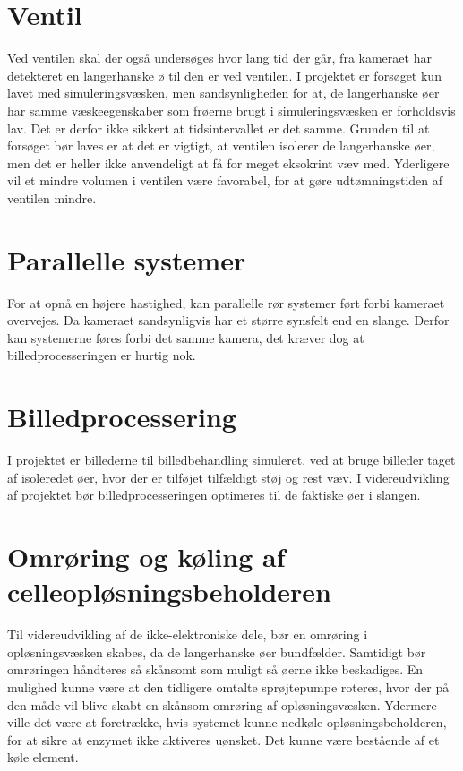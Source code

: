 \section{Ventil}
Ved ventilen skal der også undersøges hvor lang tid der går, fra kameraet har detekteret en langerhanske ø til den er ved ventilen. I projektet er forsøget kun lavet med simuleringsvæsken, men sandsynligheden for at, de langerhanske øer har samme væskeegenskaber som frøerne brugt i simuleringsvæsken er forholdsvis lav. Det er derfor ikke sikkert at tidsintervallet er det samme. Grunden til at forsøget bør laves er at det er vigtigt, at ventilen isolerer de langerhanske øer, men det er heller ikke anvendeligt at få for meget eksokrint væv med. Yderligere vil et mindre volumen i ventilen være favorabel, for at gøre udtømningstiden af ventilen mindre.   

\section{Parallelle systemer}
For at opnå en højere hastighed, kan parallelle rør systemer ført forbi kameraet overvejes.
Da kameraet sandsynligvis har et større synsfelt end en slange. Derfor kan systemerne føres forbi det samme kamera, det kræver dog at billedprocesseringen er hurtig nok.

\section{Billedprocessering}
I projektet er billederne til billedbehandling simuleret, ved at bruge billeder taget af isoleredet øer, hvor der er tilføjet tilfældigt støj og rest væv. I videreudvikling af projektet bør billedprocesseringen optimeres til de faktiske øer i slangen.

\section{Omrøring og køling af celleopløsningsbeholderen}
Til videreudvikling af de ikke-elektroniske dele, bør en omrøring i opløsningsvæsken skabes, da de langerhanske øer bundfælder. Samtidigt bør omrøringen håndteres så skånsomt som muligt så øerne ikke beskadiges. En mulighed kunne være at den tidligere omtalte sprøjtepumpe roteres, hvor der på den måde vil blive skabt en skånsom omrøring af opløsningsvæsken. Ydermere ville det være at foretrække, hvis systemet kunne nedkøle opløsningsbeholderen, for at sikre at enzymet ikke aktiveres uønsket. Det kunne være bestående af et køle element. 

